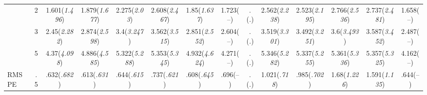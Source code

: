 \documentclass{article}
\begin{document}
\begin{table}[tbp]
{\begin{tabularx}{\textwidth}{lCCCCCCCCCCCCC}
&2&1.601\newline (\emph{1.496})&1.879\newline (\emph{1.677})&2.275\newline (\emph{2.03})&2.608\newline (\emph{2.467})&1.85\newline (\emph{1.637})&1.723\newline (--)&.\newline (\emph{.})&2.562\newline (\emph{2.238})&2.523\newline (\emph{2.195})&2.766\newline (\emph{2.536})&2.737\newline (\emph{2.481})&1.658\newline (--) \tabularnewline
&3&2.45\newline (\emph{2.282})&2.874\newline (\emph{2.598})&3.4\newline (\emph{3.247})&3.562\newline (\emph{3.515})&2.851\newline (\emph{2.552})&2.604\newline (--)&.\newline (\emph{.})&3.519\newline (\emph{3.301})&3.492\newline (\emph{3.251})&3.6\newline (\emph{3.493})&3.587\newline (\emph{3.452})&2.487\newline (--) \tabularnewline
&5&4.37\newline (\emph{4.098})&4.886\newline (\emph{4.585})&5.322\newline (\emph{5.288})&5.353\newline (\emph{5.345})&4.932\newline (\emph{4.624})&4.271\newline (--)&.\newline (\emph{.})&5.346\newline (\emph{5.282})&5.337\newline (\emph{5.255})&5.361\newline (\emph{5.336})&5.357\newline (\emph{5.325})&4.162\newline (--) \tabularnewline
\midrule RMSPE&.5&.632\newline (\emph{.682})&.613\newline (\emph{.631})&.644\newline (\emph{.615})&.737\newline (\emph{.621})&.608\newline (\emph{.645})&.696\newline (--)&.\newline (\emph{.})&1.021\newline (\emph{.718})&.985\newline (\emph{.702})&1.68\newline (\emph{1.226})&1.591\newline (\emph{1.135})&.644\newline (--) \tabularnewline

\end{tabularx}}
\end{table}
\end{document}
